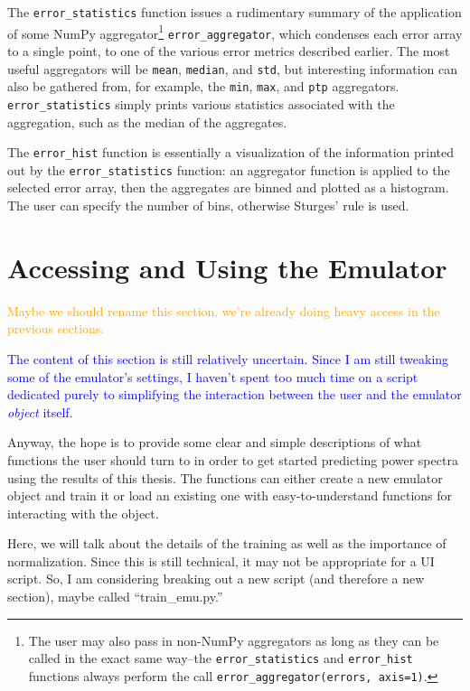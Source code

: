 The \verb|error_statistics| function issues a rudimentary summary of the 
application of some NumPy aggregator\footnote{The user may also pass in
non-NumPy aggregators as long as they can be called in the exact same
way--the \verb|error_statistics| and \verb|error_hist| functions always
perform the call \verb|error_aggregator(errors, axis=1)|.}
\verb|error_aggregator|, which condenses each error array to a single point,
to one of the various error metrics described earlier. The 
most useful aggregators will be \verb|mean|, \verb|median|, and \verb|std|, 
but interesting information can also be gathered from, for example, the
\verb|min|, \verb|max|, and \verb|ptp| aggregators.
\verb|error_statistics| simply prints various statistics associated with the 
aggregation, such as the median of the aggregates.

The \verb|error_hist| function is essentially a visualization of the 
information printed out by the \verb|error_statistics| function: an aggregator
function is applied to the selected error array, then the aggregates are 
binned and plotted as a histogram. The user can specify the number of bins,
otherwise Sturges' rule is used.


\section{Accessing and Using the Emulator}


\textcolor{orange}{Maybe we should rename this section, we're already doing
heavy access in the previous sections.}

\textcolor{blue}{The content of this section is still relatively uncertain. 
Since I am still tweaking some of the emulator's settings, I haven't spent too 
much time on a script dedicated purely to simplifying the interaction between 
the user and the emulator \textit{object} itself.}

Anyway, the hope is to provide some clear and simple descriptions of what functions the user should turn to in order to get started predicting power spectra using the results of this thesis. The functions can either create a new emulator object and train it or load an existing one with easy-to-understand functions for interacting with the object.

Here, we will talk about the details of the training as well as the importance of normalization. Since this is still technical, it may not be appropriate for a UI script. So, I am considering breaking out a new script (and therefore a new section), maybe called ``train\_emu.py.''

